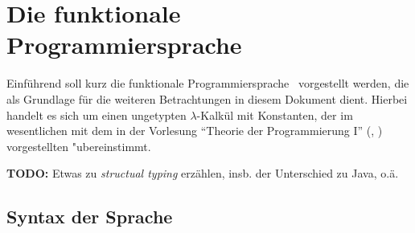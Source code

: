 %
%



\section{Die funktionale Programmiersprache \Lf}

Einf\"uhrend soll kurz die funktionale Programmiersprache \Lf\ vorgestellt werden, die als
Grundlage f\"ur die weiteren Betrachtungen in diesem Dokument dient. Hierbei handelt es
sich um einen ungetypten $\lambda$-Kalk\"ul mit Konstanten, der im wesentlichen
mit dem in der Vorlesung "`Theorie der Programmierung I"' (\cite{Sieber04}, \cite{Sieber06})
vorgestellten "ubereinstimmt.

{\bf TODO:} Etwas zu {\em structual typing} erz\"ahlen, insb. der Unterschied zu Java, o.\"a.



\subsection{Syntax der Sprache \Lf}

